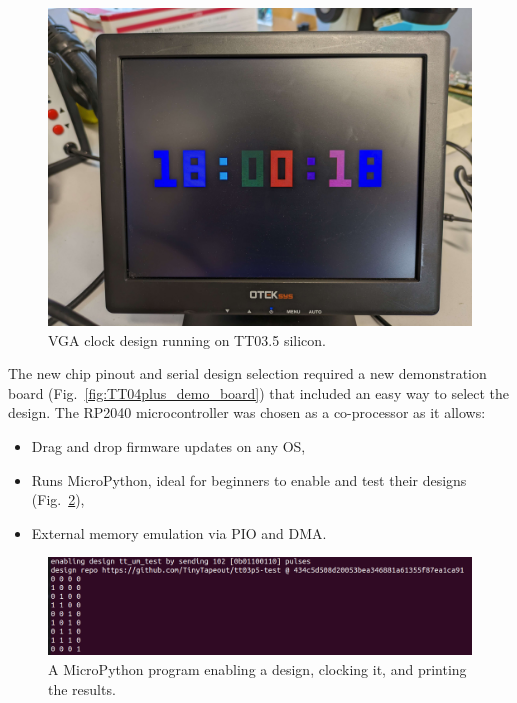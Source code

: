 \begin{figure}[!t]
\centering
\includegraphics[width=\columnwidth]{./Figs/tt3p5 vga clock.jpg}
\caption{VGA clock design running on TT03.5 silicon.}
\label{fig:VGA_clock_design_TT03_5_silicon}
\end{figure}

The new chip pinout and serial design selection required a new demonstration board (Fig.~\ref{fig:TT04plus_demo_board}) that included an easy way to select the design.
The RP2040 microcontroller was chosen as a co-processor as it allows:

\begin{itemize}
\item Drag and drop firmware updates on any OS,
\item Runs MicroPython\cite{micropython}, ideal for beginners to enable and test their designs (Fig.~\ref{fig:micropython_program}),
\item External memory emulation via PIO and DMA.
\end{itemize}

\begin{figure}[!t]
\centering
\includegraphics[width=\columnwidth]{./Figs/tt3p5 enable design.png}
\caption{A MicroPython program\cite{demofirmwaretest} enabling a design, clocking it, and printing the results.}
\label{fig:micropython_program}
\end{figure}

